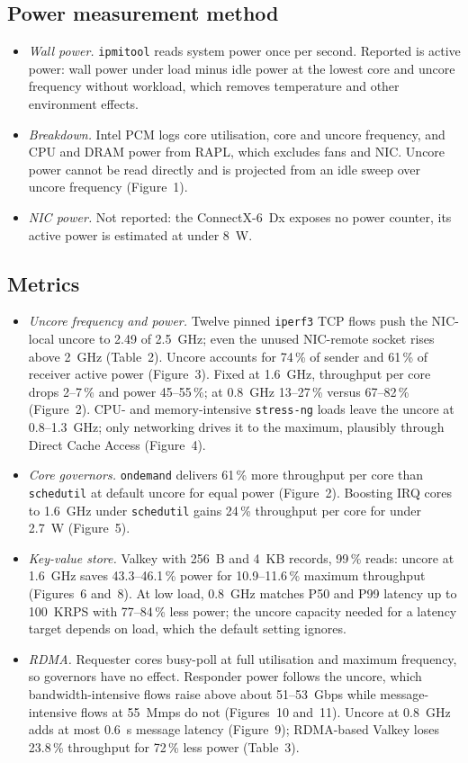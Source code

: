 \documentclass[11pt,a4paper]{article}
\begin{document}
\subsection*{\normalsize\normalfont Power measurement method}
\begin{itemize}
\setlength{\itemsep}{2pt}
\item \emph{Wall power.}
\texttt{ipmitool} reads system power once per second.
Reported is active power: wall power under load minus idle power at the lowest core and uncore frequency without workload, which removes temperature and other environment effects.
\item \emph{Breakdown.}
Intel PCM logs core utilisation, core and uncore frequency, and CPU and DRAM power from RAPL, which excludes fans and NIC.
Uncore power cannot be read directly and is projected from an idle sweep over uncore frequency (Figure~1).
\item \emph{NIC power.}
Not reported: the ConnectX-6~Dx exposes no power counter, its active power is estimated at under 8~W.
\end{itemize}

\subsection*{\normalsize\normalfont Metrics}
\begin{itemize}
\setlength{\itemsep}{2pt}
\item \emph{Uncore frequency and power.}
Twelve pinned \texttt{iperf3} TCP flows push the NIC-local uncore to 2.49 of 2.5~GHz; even the unused NIC-remote socket rises above 2~GHz (Table~2).
Uncore accounts for 74\,\% of sender and 61\,\% of receiver active power (Figure~3).
Fixed at 1.6~GHz, throughput per core drops 2--7\,\% and power 45--55\,\%; at 0.8~GHz 13--27\,\% versus 67--82\,\% (Figure~2).
CPU- and memory-intensive \texttt{stress-ng} loads leave the uncore at 0.8--1.3~GHz; only networking drives it to the maximum, plausibly through Direct Cache Access (Figure~4).
\item \emph{Core governors.}
\texttt{ondemand} delivers 61\,\% more throughput per core than \texttt{schedutil} at default uncore for equal power (Figure~2).
Boosting IRQ cores to 1.6~GHz under \texttt{schedutil} gains 24\,\% throughput per core for under 2.7~W (Figure~5).
\item \emph{Key-value store.}
Valkey with 256~B and 4~KB records, 99\,\% reads: uncore at 1.6~GHz saves 43.3--46.1\,\% power for 10.9--11.6\,\% maximum throughput (Figures~6 and~8).
At low load, 0.8~GHz matches P50 and P99 latency up to 100~KRPS with 77--84\,\% less power; the uncore capacity needed for a latency target depends on load, which the default setting ignores.
\item \emph{RDMA.}
Requester cores busy-poll at full utilisation and maximum frequency, so governors have no effect.
Responder power follows the uncore, which bandwidth-intensive flows raise above about 51--53~Gbps while message-intensive flows at 55~Mmps do not (Figures~10 and~11).
Uncore at 0.8~GHz adds at most 0.6~\textmu s message latency (Figure~9); RDMA-based Valkey loses 23.8\,\% throughput for 72\,\% less power (Table~3).
\end{itemize}
\end{document}
